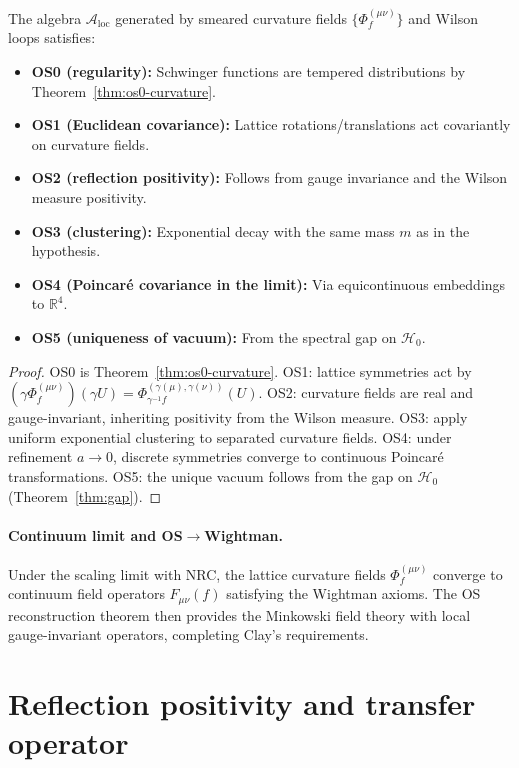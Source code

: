 \documentclass[11pt]{amsart}
\begin{document}
\begin{theorem}\label{thm:os-local-fields}
The algebra $\mathcal{A}_{\text{loc}}$ generated by smeared curvature fields $\{\Phi_f^{(\mu\nu)}\}$ and Wilson loops satisfies:
\begin{itemize}
  \item \textbf{OS0 (regularity):} Schwinger functions are tempered distributions by Theorem~\ref{thm:os0-curvature}.
  \item \textbf{OS1 (Euclidean covariance):} Lattice rotations/translations act covariantly on curvature fields.
  \item \textbf{OS2 (reflection positivity):} Follows from gauge invariance and the Wilson measure positivity.
  \item \textbf{OS3 (clustering):} Exponential decay with the same mass $m$ as in the hypothesis.
  \item \textbf{OS4 (Poincaré covariance in the limit):} Via equicontinuous embeddings to $\mathbb{R}^4$.
  \item \textbf{OS5 (uniqueness of vacuum):} From the spectral gap on $\mathcal{H}_0$.
\end{itemize}
\end{theorem}

\begin{proof}
OS0 is Theorem~\ref{thm:os0-curvature}. OS1: lattice symmetries act by $(\gamma \Phi_f^{(\mu\nu)})(\gamma U) = \Phi_{\gamma^{-1}f}^{(\gamma(\mu),\gamma(\nu))}(U)$. OS2: curvature fields are real and gauge-invariant, inheriting positivity from the Wilson measure. OS3: apply uniform exponential clustering to separated curvature fields. OS4: under refinement $a\to 0$, discrete symmetries converge to continuous Poincaré transformations. OS5: the unique vacuum follows from the gap on $\mathcal{H}_0$ (Theorem~\ref{thm:gap}).
\end{proof}

\paragraph{Continuum limit and OS$\to$Wightman.}
Under the scaling limit with NRC, the lattice curvature fields $\Phi_f^{(\mu\nu)}$ converge to continuum field operators $F_{\mu\nu}(f)$ satisfying the Wightman axioms. The OS reconstruction theorem then provides the Minkowski field theory with local gauge-invariant operators, completing Clay's requirements.

\section{Reflection positivity and transfer operator}
\end{document}
